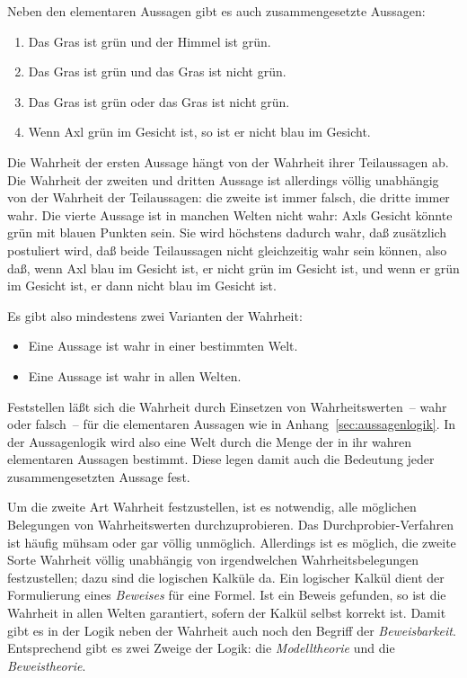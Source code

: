 Neben den elementaren
Aussagen
gibt es auch zusammengesetzte Aussagen:
%
\begin{enumerate}
\item Das Gras ist grün und der Himmel ist grün.
\item Das Gras ist grün und das Gras ist nicht grün.
\item Das Gras ist grün oder das Gras ist nicht grün.
\item Wenn Axl grün im Gesicht ist, so ist er nicht blau im Gesicht.
\end{enumerate}
%
Die Wahrheit der ersten Aussage hängt von der Wahrheit ihrer
Teilaussagen ab.  Die Wahrheit der zweiten und dritten Aussage ist
allerdings völlig unabhängig von der Wahrheit der Teilaussagen: die
zweite ist immer falsch, die dritte immer wahr.  Die vierte Aussage
ist in manchen Welten nicht wahr: Axls Gesicht könnte grün mit
blauen Punkten sein.  Sie wird höchstens dadurch wahr, daß zusätzlich postuliert
wird, daß beide Teilaussagen nicht gleichzeitig wahr sein können,
also daß, wenn Axl blau im Gesicht ist, er nicht grün im Gesicht ist,
und wenn er grün im Gesicht ist, er dann nicht blau im Gesicht ist.

Es gibt also mindestens zwei Varianten der Wahrheit:
%
\begin{itemize}
\item Eine Aussage ist wahr in einer bestimmten Welt.
\item Eine Aussage ist wahr in allen Welten.
\end{itemize}
%
Feststellen läßt sich die Wahrheit durch Einsetzen von
Wahrheitswerten~-- wahr oder falsch~--
für die elementaren Aussagen wie in
Anhang~\ref{sec:aussagenlogik}.  In der
Aussagenlogik wird also eine Welt durch die Menge der in ihr wahren
elementaren Aussagen bestimmt.  Diese legen damit auch die Bedeutung jeder
zusammengesetzten Aussage fest.

Um die
zweite Art Wahrheit festzustellen, ist es notwendig, alle möglichen
Belegungen von Wahrheitswerten durchzuprobieren.  
Das Durchprobier-Verfahren ist häufig mühsam oder gar völlig unmöglich.  
Allerdings ist es möglich, die zweite Sorte Wahrheit völlig
unabhängig von irgendwelchen Wahrheitsbelegungen festzustellen; dazu
sind die logischen Kalküle da.  Ein logischer Kalkül dient der
Formulierung eines \textit{Beweises} für eine Formel.  Ist ein Beweis
gefunden, so ist die Wahrheit in allen Welten garantiert, sofern der Kalkül
selbst korrekt ist.  Damit gibt
es in der Logik neben der Wahrheit auch noch den Begriff der
\textit{Beweisbarkeit}.  Entsprechend gibt es zwei Zweige der Logik:
die \textit{Modelltheorie} und die \textit{Beweistheorie}.

